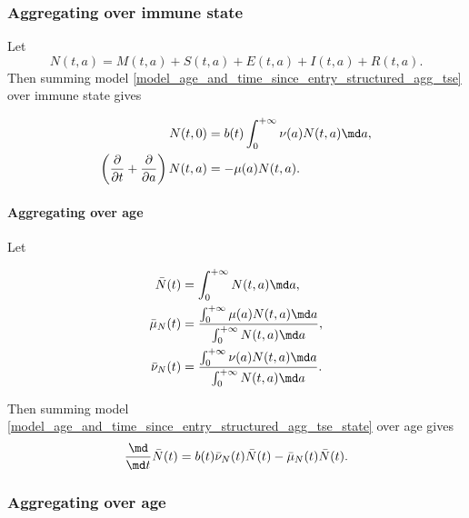 \documentclass{jpmarticle}
\let\subequationsorig\subequations%
\let\endsubequationsorig\endsubequations%
\renewenvironment{subequations}{
  \subequationsorig
  \renewcommand{\theequation}{\theparentequation.\arabic{equation}}
}{
  \endsubequationsorig
}
\begin{document}
\subsubsection{Aggregating over immune state}

Let
\begin{equation}
  N(t, a)
  = M(t, a) + S(t, a) + E(t, a) + I(t, a) + R(t, a).
\end{equation}
Then summing model
\eqref{model_age_and_time_since_entry_structured_agg_tse} over immune
state gives
\begin{subequations}
  \label{model_age_and_time_since_entry_structured_agg_tse_state}
  \begin{align}
    N(t, 0)
    &= b(t) \int_0^{+\infty} \nu(a) N(t, a) \md a,
    \\
    \left(\frac{\partial}{\partial t}
      + \frac{\partial}{\partial a}\right)
    N(t, a)
    &= - \mu(a) N(t, a).
  \end{align}
\end{subequations}


\paragraph{Aggregating over age}

Let
\begin{subequations}
  \begin{align}
    \bar{N}(t)
    &= \int_0^{+\infty} N(t, a) \md a,
    \\
    \bar{\mu}_N(t)
    &= \frac{\int_0^{+\infty} \mu(a) N(t, a) \md a}
    {\int_0^{+\infty} N(t, a) \md a},
    \\
    \bar{\nu}_N(t)
    &= \frac{\int_0^{+\infty} \nu(a) N(t, a) \md a}
    {\int_0^{+\infty} N(t, a) \md a}.
  \end{align}
\end{subequations}
Then summing model
\eqref{model_age_and_time_since_entry_structured_agg_tse_state} over
age gives
\begin{equation}
  \label{model_age_and_time_since_entry_structured_agg_tse_state_age}
  \frac{\md}{\md t} \bar{N}(t)
  = b(t) \bar{\nu}_N(t) \bar{N}(t)
  - \bar{\mu}_N(t) \bar{N}(t).
\end{equation}


\subsubsection{Aggregating over age}
\end{document}
